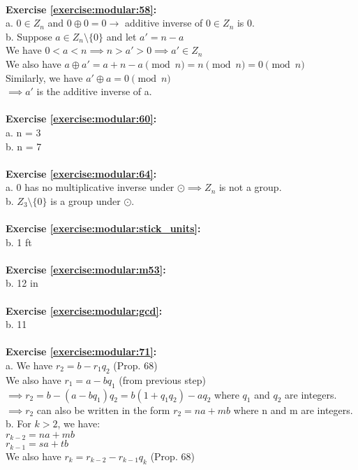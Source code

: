 \\
\textbf{Exercise \ref{exercise:modular:58}:}\\
a. $0 \in Z_n$ and $0 \oplus 0=0 \to$ additive inverse of $0 \in Z_n$ is 0.\\
b. Suppose $a \in Z_n \setminus \{0\}$ and let $a'=n-a$\\
We have $0<a<n \implies n>a'>0 \implies a' \in Z_n$\\
We also have $a \oplus a'=a+n-a \pmod{n}=n \pmod{n}=0 \pmod{n}$\\
Similarly, we have $a' \oplus a=0 \pmod{n}$\\
$\implies a'$ is the additive inverse of a.\\
\\
\textbf{Exercise \ref{exercise:modular:60}:}\\
a. n = 3\\
b. n = 7\\
\\
\textbf{Exercise \ref{exercise:modular:64}:}\\
a. 0 has no multiplicative inverse under $\odot \implies Z_n$ is not a group.\\
b. $Z_3 \setminus \{0\}$ is a group under $\odot$.\\
\\
\textbf{Exercise \ref{exercise:modular:stick_units}:}\\
b. 1 ft\\
\\
\textbf{Exercise \ref{exercise:modular:m53}:}\\%
b. 12 in\\
\\
\textbf{Exercise \ref{exercise:modular:gcd}:}\\
b. 11\\
\\
\textbf{Exercise \ref{exercise:modular:71}:}\\
a. We have $r_2=b-r_1q_2$ (Prop. 68)\\
We also have $r_1=a-bq_1$ (from previous step)\\
$\implies r_2=b-(a-bq_1)q_2=b(1+q_1q_2)-aq_2$ where $q_1$ and $q_2$ are integers.\\
$\implies r_2$ can also be written in the form $r_2=na+mb$ where n and m are integers.\\
b. For $k>2$, we have:\\
$r_{k-2}=na+mb$\\
$r_{k-1}=sa+tb$\\
We also have $r_k=r_{k-2}-r_{k-1}q_k$ (Prop. 68)\\
